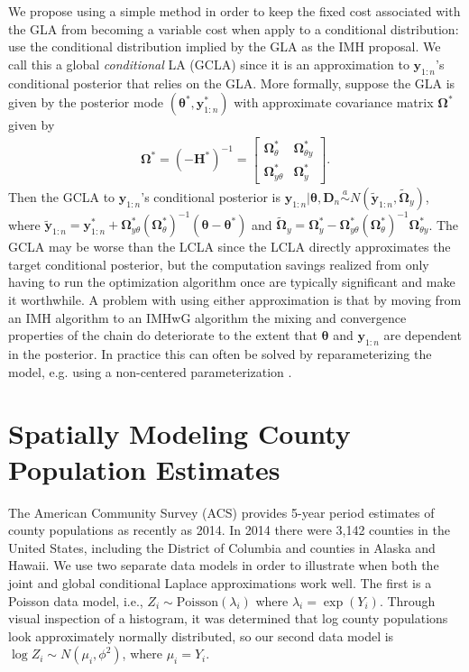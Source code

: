 \documentclass[12pt]{article}
\begin{document}
We propose using a simple method in order to keep the fixed cost associated with the GLA from becoming a variable cost when apply to a conditional distribution: use the conditional distribution implied by the GLA as the IMH proposal. We call this a global \emph{conditional} LA (GCLA) since it is an approximation to $\bm{y}_{1:n}$'s conditional posterior that relies on the GLA. More formally, suppose the GLA is given by the posterior mode $(\bm{\theta}^*, \bm{y}_{1:n}^*)$ with approximate covariance matrix $\bm{\Omega}^*$ given by
\begin{align*}
\bm{\Omega}^* = (-\bm{H}^*)^{-1} = \begin{bmatrix} \bm{\Omega}^*_{\theta} & \bm{\Omega}^*_{\theta y} \\ \bm{\Omega}^*_{y \theta} & \bm{\Omega}^*_{y} \end{bmatrix}.
\end{align*}
Then the GCLA to $\bm{y}_{1:n}$'s conditional posterior is $\bm{y}_{1:n}|\bm{\theta},\bm{D}_n \stackrel{a}{\sim} N(\widetilde{\bm{y}}_{1:n}, \widetilde{\bm{\Omega}}_{y})$, where $\widetilde{\bm{y}}_{1:n} = \bm{y}_{1:n}^* + \bm{\Omega}_{y\theta}^*(\bm{\Omega}_{\theta}^*)^{-1}(\bm{\theta} - \bm{\theta}^*)$ and $\widetilde{\bm{\Omega}}_{y} = \bm{\Omega}_{y}^* - \bm{\Omega}_{y\theta}^*(\bm{\Omega}_{\theta}^*)^{-1}\bm{\Omega}_{\theta y}^*$. The GCLA may be worse than the LCLA since the LCLA directly approximates the target conditional posterior, but the computation savings realized from only having to run the optimization algorithm once are typically significant and make it worthwhile. A problem with using either approximation is that by moving from an IMH algorithm to an IMHwG algorithm the mixing and convergence properties of the chain do deteriorate to the extent that $\bm{\theta}$ and $\bm{y}_{1:n}$ are dependent in the posterior. In practice this can often be solved by reparameterizing the model, e.g. using a non-centered parameterization \citep{gelfand1995efficient,roberts1997updating,van2001art,bernardo2003non}.




\section{Spatially Modeling County Population Estimates}\label{sec:pop}
The American Community Survey (ACS) provides 5-year period estimates of county populations as recently as 2014. In 2014 there were 3,142 counties in the United States, including the District of Columbia and counties in Alaska and Hawaii.  We use two separate data models in order to illustrate when both the joint and global conditional Laplace approximations work well. The first is a Poisson data model, i.e., $Z_i \sim \mathrm{Poisson}(\lambda_i)$ where $\lambda_i = \exp(Y_i)$. Through visual inspection of a histogram, it was determined that log county populations look approximately normally distributed, so our second data model is $\log Z_i \sim N(\mu_i, \phi^2)$, where $\mu_i = Y_i$.
\end{document}
